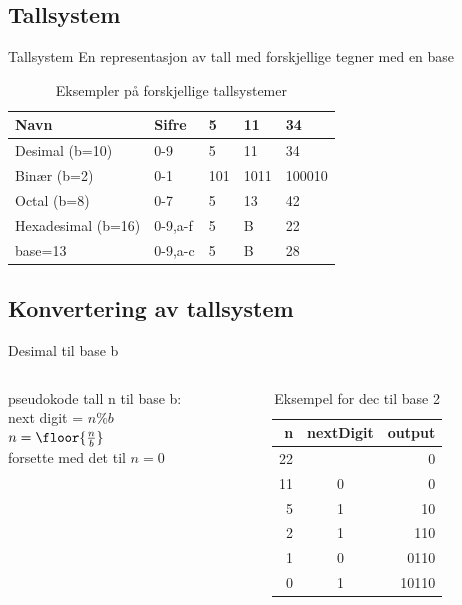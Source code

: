 \subsection*{Tallsystem}
\begin{frame}
\begin{block}{Tallsystem}
En representasjon av tall med forskjellige tegner med en base
\end{block}
\pause

\medskip

\begin{table}[]
\centering
\label{tab:tallsystemer}
\begin{tabular}{l|l|l|l|l}
Navn & Sifre & 5 & 11 & 34 \\ \hline
Desimal (b=10) & 0-9 & 5& 11 & 34 \\
Binær (b=2) & 0-1 & 101 & 1011 & 100010 \\
Octal (b=8) & 0-7 & 5&  13 & 42\\
Hexadesimal (b=16) & 0-9,a-f& 5& B& 22\\
base=13 & 0-9,a-c & 5& B& 28
\end{tabular}
\caption{Eksempler på forskjellige tallsystemer}
\end{table}
\end{frame}

\subsection*{Konvertering av tallsystem}
\begin{frame}[fragile]{Desimal til base b}
\begin{columns}
    \begin{column}{0.30\textwidth}
    \begin{block}{pseudokode}
            tall n til base b:\\
            next digit = $n\%b$\\
            $n=\floor{\frac{n}{b}}$\\
            forsette med det til $n=0$
    \end{block}
    \end{column}
 	\pause
    \begin{column}{0.66\textwidth}
\begin{table}
\begin{tabular}{r|c|r}
n & nextDigit & output \\ \hline
22 & & 0 \\
11 & 0 & 0\\
5 & 1 & 10\\
2 & 1 & 110\\
1 & 0 & 0110\\
0 & 1 & 10110
\end{tabular}
\caption{Eksempel for dec til base 2}
\end{table}
 	\end{column}
 	\end{columns}
\end{frame}

